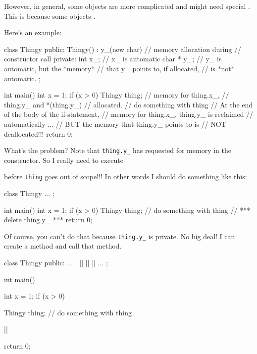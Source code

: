 \newpage{}

However, in general, some objects are more complicated and might need
special . This is because some objects
.

Here's an example:

\begin{consolethree}[escapeinside=||]
class Thingy
{
public:
    Thingy()
        : y_(new char) // memory allocation during
    {}                 // constructor call
private:
    int x_;     // x_ is automatic
    char * y_;  // y_ is automatic, but the *memory*
                // that y_ points to, if allocated,
                // is *not* automatic.
};

int main()
{
    int x = 1;
    if (x > 0)
    {
        Thingy thing; // memory for thing.x_,
                      // thing.y_ and *(thing.y_)
                      // allocated.
        // do something with thing
    } // At the end of the body of the if-statement,
      // memory for thing.x_, thing.y_ is reclaimed
      // automatically ...
      // BUT the memory that thing.y_ points to is
      // NOT deallocated!!!
    return 0;
}
\end{consolethree}

What's the problem? Note that \texttt{thing.y\_} has
requested for memory in the constructor. So I really need to execute


before \texttt{thing} goes out of scope!!! In other words I should do
something like this:

\begin{consolethree}[escapeinside=||]
class Thingy
{
    ...
};

int main()
{
    int x = 1;
    if (x > 0)
    {
        Thingy thing;
        // do something with thing
        // *** delete thing.y_ ***
    }
    return 0;
}
\end{consolethree}

Of course, you can't do that because \texttt{thing.y\_} is
private. No big deal! I can create a method and call that method.

\begin{consolethree}[escapeinside=||]
class Thingy
{
public:
    ...
    |
    |\EMPHASIZE{\{}|
        ||
    |\EMPHASIZE{\}}|
    ...
};

int main()
{
    int x = 1;
    if (x > 0)
    {
        Thingy thing;
        // do something with thing
        
        ||
    }
    return 0;
}
\end{consolethree}


